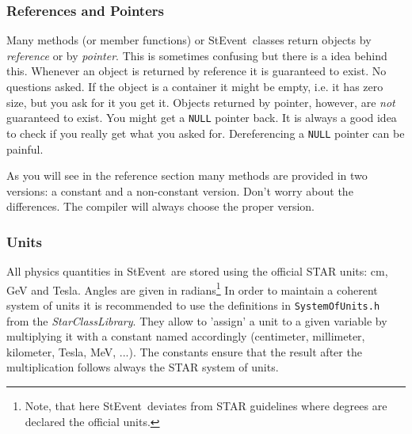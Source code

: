 \documentclass[twoside]{article}
\newcommand{\name}[1]{\textsl{#1}}%
\newcommand{\StEvent}{\textsf{StEvent}}
\begin{document}
\subsubsection{References and Pointers}
 

Many methods (or member functions) or \StEvent\ classes return objects
by \emph{reference} or by \emph{pointer}. This is sometimes confusing
but there is a idea behind this. Whenever an object is returned by
reference it is guaranteed to exist. No questions asked. If the object
is a container it might be empty, i.e. it has zero size, but you ask
for it you get it. Objects returned by pointer, however, are
\emph{not} guaranteed to exist. You might get a \texttt{NULL} pointer
back.  It is always a good idea to check if you really get what you
asked for.  Dereferencing a \texttt{NULL} pointer can be painful.

As you will see in the reference section many methods are provided in
two versions: a constant and a non-constant version. Don't worry about
the differences. The compiler will always choose the proper version.

\subsubsection{Units}
\label{sec:units}
 

All physics quantities in \StEvent\ are stored using the official STAR
units: cm, GeV and Tesla.  Angles are given in radians\footnote{Note,
    that here \StEvent\ deviates from STAR guidelines where degrees
    are declared the official units.}  In order to maintain a coherent
system of units it is recommended to use the definitions in
\texttt{SystemOfUnits.h} from the \name{StarClassLibrary}. They allow
to 'assign' a unit to a given variable by multiplying it with a
constant named accordingly (centimeter, millimeter, kilometer, Tesla,
MeV, ...).  The constants ensure that the result after the
multiplication follows always the STAR system of units.
\end{document}
